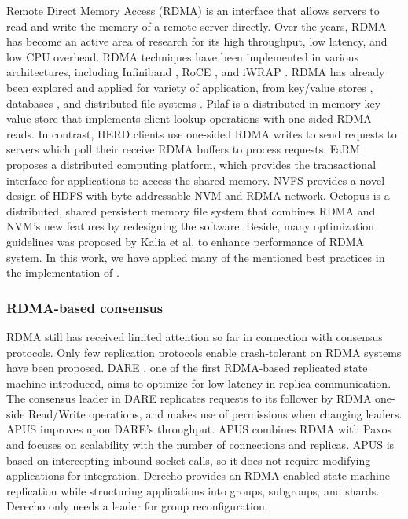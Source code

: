 Remote Direct Memory Access (RDMA) \cite{kalia2016design} is an interface that
allows servers to read and write the memory of a remote server directly. Over
the years, RDMA has become an active area of research for its high throughput,
low latency, and low CPU overhead. RDMA techniques have been implemented in
various architectures, including Infiniband \cite{pfister2001introduction}, RoCE
\cite{beck2011performance}, and iWRAP \cite{rashti200710}. RDMA has already been
explored and applied for variety of application, from key/value stores
\cite{FaRM, kalia2014using, mitchell2013using, wei2015fast}, databases
\cite{binnig2015end, huang2019rdma}, and distributed file systems
\cite{islam2012high, li2009early, wu2003pvfs}. Pilaf \cite{mitchell2013using} is
a distributed in-memory key-value store that implements client-lookup operations
with one-sided RDMA reads. In contrast, HERD \cite{kalia2014using} clients use
one-sided RDMA writes to send requests to servers which poll their receive RDMA
buffers to process requests. FaRM \cite{FaRM} proposes a distributed computing
platform, which provides the transactional interface for applications to access
the shared memory. NVFS \cite{islam2012high} provides a novel design of HDFS
with byte-addressable NVM and RDMA network. Octopus \cite{lu2017octopus} is a
distributed, shared persistent memory file system that combines RDMA and NVM's
new features by redesigning the software. Beside, many optimization guidelines
was proposed by Kalia et al. \cite{kalia2016design} to enhance performance of
RDMA system. In this work, we have applied many of the mentioned best practices
in the implementation of \libname.


\subsubsection*{RDMA-based consensus}

RDMA still has received limited attention so far in connection with consensus
protocols. Only few replication protocols enable crash-tolerant on RDMA systems
have been proposed. DARE \cite{DARE}, one of the first RDMA-based replicated
state machine introduced, aims to optimize for low latency in replica
communication. The consensus leader in DARE replicates requests to its follower
by RDMA one-side Read/Write operations, and makes use of permissions when
changing leaders. APUS \cite{APUS} improves upon DARE’s throughput. APUS
combines RDMA with Paxos and focuses on scalability with the number of
connections and replicas. APUS is based on intercepting inbound socket calls, so
it does not require modifying applications for integration. Derecho
\cite{jha2019derecho} provides an RDMA-enabled state machine replication while
structuring applications into groups, subgroups, and shards. Derecho only needs
a leader for group reconfiguration. 

